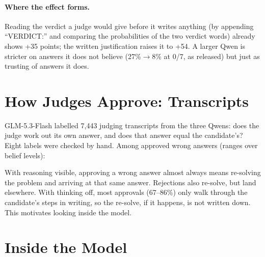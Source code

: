 \documentclass[11pt]{article}
\begin{document}
\paragraph{Where the effect forms.}
Reading the verdict a judge would give before it writes anything (by appending ``VERDICT:'' and comparing the
probabilities of the two verdict words) already shows +35 points; the written justification raises it to +54. A
larger Qwen is stricter on answers it does not believe (27\%$\rightarrow$8\% at 0/7, as released) but just as
trusting of answers it does.

\section{How Judges Approve: Transcripts}
\label{sec:transcripts}

GLM-5.3-Flash labelled 7,443 judging transcripts from the three Qwens: does the judge work out its own answer, and
does that answer equal the candidate's? Eight labels were checked by hand. Among approved wrong answers (ranges over
belief levels):

\begin{center}
\small
{}
\end{center}

With reasoning visible, approving a wrong answer almost always means re-solving the problem and arriving at that
same answer. Rejections also re-solve, but land elsewhere. With thinking off, most approvals (67--86\%) only walk
through the candidate's steps in writing, so the re-solve, if it happens, is not written down. This motivates
looking inside the model.

\section{Inside the Model}
\label{sec:inside}
\end{document}
